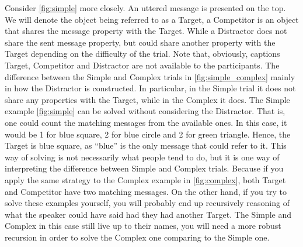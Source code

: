 Consider \autoref{fig:simple} more closely. An uttered message is presented on the top. We will denote the object being referred to as a Target, a Competitor is an object that shares the message property with the Target. While a Distractor does not share the sent message property, but could share another property with the Target depending on the difficulty of the trial. Note that, obviously, captions Target, Competitor and Distractor are not available to the participants. The difference between the Simple and Complex trials in \autoref{fig:simple_complex} mainly in how the Distractor is constructed. In particular, in the Simple trial it does not share any properties with the Target, while in the Complex it does. The Simple example \autoref{fig:simple} can be solved without considering the Distractor. That is, one could count the matching messages from the available ones. In this case, it would be 1 for blue square, 2 for blue circle and 2 for green triangle. Hence, the Target is blue square, as ``blue'' is the only message that could refer to it. This way of solving is not necessarily what people tend to do, but it is one way of interpreting the difference between Simple and Complex trials. Because if you apply the same strategy to the Complex example in \autoref{fig:complex}, both Target and Competitor have two matching messages. On the other hand, if you try to solve these examples yourself, you will probably end up recursively reasoning of what the speaker could have said had they had another Target. The Simple and Complex in this case still live up to their names, you will need a more robust recursion in order to solve the Complex one comparing to the Simple one.

